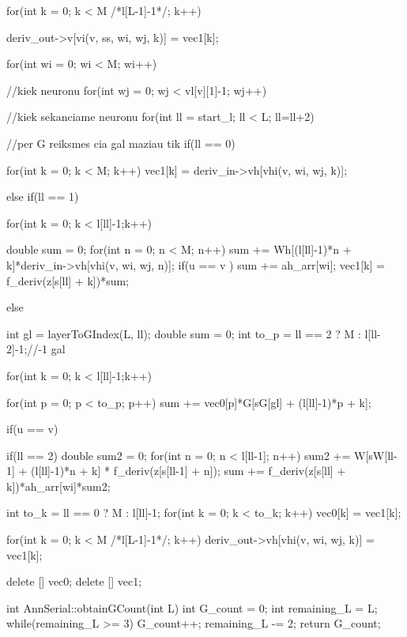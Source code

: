 {{{{{          }
          for(int k = 0; k < M /*l[L-1]-1*/; k++){
            deriv\_out->v[vi(v, ss, wi, wj, k)] = vec1[k];

          }
        }
      }
    }

      for(int wi = 0; wi < M; wi++){//kiek neuronu
        for(int wj = 0; wj < vl[v][1]-1; wj++){//kiek sekanciame neuronu
          for(int ll = start\_l; ll < L; ll=ll+2){//per G reiksmes  cia gal maziau tik
            if(ll == 0){

              for(int k = 0; k < M; k++)
                vec1[k] = deriv\_in->vh[vhi(v, wi, wj, k)];

            }else if(ll == 1){

              for(int k = 0; k < l[ll]-1;k++){
                double sum = 0;
                for(int n = 0; n < M; n++)
                  sum += Wh[(l[ll]-1)*n + k]*deriv\_in->vh[vhi(v, wi, wj, n)];
                if(u == v ) sum += ah\_arr[wi];
                vec1[k] = f\_deriv(z[s[ll] + k])*sum;

              }

            }else {


              int gl = layerToGIndex(L, ll);
              double sum = 0;
              int to\_p = ll == 2 ? M : l[ll-2]-1;//-1 gal


              for(int k = 0; k < l[ll]-1;k++){
                for(int p = 0; p < to\_p; p++){
                  sum += vec0[p]*G[sG[gl] + (l[ll]-1)*p + k];
                }


                if(u == v){

                  if(ll == 2){
                    double sum2 = 0;
                    for(int n = 0; n < l[ll-1]; n++)
                      sum2 += W[sW[ll-1] + (l[ll]-1)*n + k] * f\_deriv(z[s[ll-1] + n]);
                    sum += f\_deriv(z[s[ll] + k])*ah\_arr[wi]*sum2;
                  }
                }
              }
            }

            int to\_k = ll == 0 ? M : l[ll]-1;
            for(int k = 0; k < to\_k; k++) vec0[k] = vec1[k];
          }

          for(int k = 0; k < M /*l[L-1]-1*/; k++){
            deriv\_out->vh[vhi(v, wi, wj, k)] = vec1[k];
          }
        }
      }

  delete [] vec0;
  delete [] vec1;

}

int AnnSerial::obtainGCount(int L){
  int G\_count = 0;
  int remaining\_L = L;
  while(remaining\_L >= 3){
    G\_count++;
    remaining\_L -= 2;
  }
  return G\_count;
}

